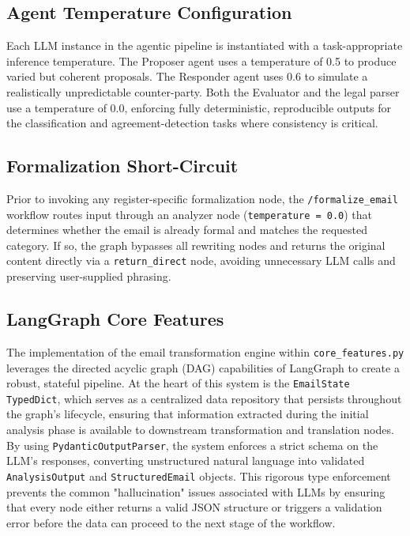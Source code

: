 \documentclass[12pt,a4paper]{report}
\begin{document}
\subsection{Agent Temperature Configuration}
Each LLM instance in the agentic pipeline is instantiated with a task-appropriate inference temperature. The Proposer agent uses a temperature of 0.5 to produce varied but coherent proposals. The Responder agent uses 0.6 to simulate a realistically unpredictable counter-party. Both the Evaluator and the legal parser use a temperature of 0.0, enforcing fully deterministic, reproducible outputs for the classification and agreement-detection tasks where consistency is critical.

\subsection{Formalization Short-Circuit}
Prior to invoking any register-specific formalization node, the \texttt{/formalize\_email} workflow routes input through an analyzer node (\texttt{temperature = 0.0}) that determines whether the email is already formal and matches the requested category. If so, the graph bypasses all rewriting nodes and returns the original content directly via a \texttt{return\_direct} node, avoiding unnecessary LLM calls and preserving user-supplied phrasing.

\subsection{LangGraph Core Features}
The implementation of the email transformation engine within \texttt{core\_features.py} leverages the directed acyclic graph (DAG) capabilities of LangGraph to create a robust, stateful pipeline. At the heart of this system is the \texttt{EmailState} \texttt{TypedDict}, which serves as a centralized data repository that persists throughout the graph's lifecycle, ensuring that information extracted during the initial analysis phase is available to downstream transformation and translation nodes. By using \texttt{PydanticOutputParser}, the system enforces a strict schema on the LLM's responses, converting unstructured natural language into validated \texttt{AnalysisOutput} and \texttt{StructuredEmail} objects. This rigorous type enforcement prevents the common "hallucination" issues associated with LLMs by ensuring that every node either returns a valid JSON structure or triggers a validation error before the data can proceed to the next stage of the workflow.
\end{document}
